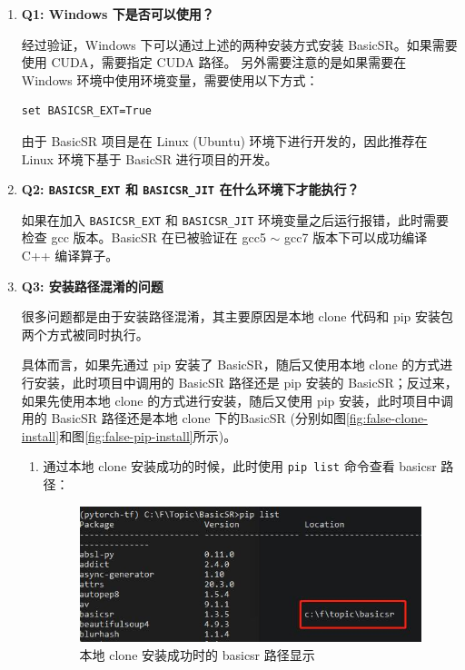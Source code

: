 \documentclass[../main.tex]{subfiles}
\begin{document}
\begin{enumerate}
    \item \textbf{Q1: Windows 下是否可以使用？}

          经过验证，Windows 下可以通过上述的两种安装方式安装 BasicSR。如果需要使用 CUDA，需要指定 CUDA 路径。	另外需要注意的是如果需要在 Windows 环境中使用环境变量，需要使用以下方式：
          \begin{verbatim}
set BASICSR_EXT=True
       \end{verbatim}

          由于 BasicSR 项目是在 Linux (Ubuntu) 环境下进行开发的，因此推荐在 Linux 环境下基于 BasicSR 进行项目的开发。

    \item \textbf{Q2: \texttt{BASICSR\_EXT} 和 \texttt{BASICSR\_JIT} 在什么环境下才能执行？}

          如果在加入 \texttt{BASICSR\_EXT} 和 \texttt{BASICSR\_JIT} 环境变量之后运行报错，此时需要检查 gcc 版本。BasicSR 在已被验证在 gcc5 $\sim$ gcc7 版本下可以成功编译 C++ 编译算子。

    \item \textbf{Q3: 安装路径混淆的问题}

          很多问题都是由于安装路径混淆，其主要原因是本地 clone 代码和 pip 安装包两个方式被同时执行。

          具体而言，如果先通过 pip 安装了 BasicSR，随后又使用本地 clone 的方式进行安装，此时项目中调用的 BasicSR 路径还是 pip 安装的 BasicSR；反过来，如果先使用本地 clone 的方式进行安装，随后又使用 pip 安装，此时项目中调用的 BasicSR 路径还是本地 clone 下的BasicSR (分别如图\ref{fig:false-clone-install}和图\ref{fig:false-pip-install}所示)。

          \begin{enumerate}
              \item 通过本地 clone 安装成功的时候，此时使用 \texttt{pip list} 命令查看 basicsr 路径：
                    \begin{figure}[H]
                        \begin{center}
                            \includegraphics[width=0.7\linewidth]{figures/installation_clone_install_location.jpg}
                            \caption{本地 clone 安装成功时的 basicsr 路径显示}
                            \label{fig:correct-clone-install}
                        \end{center}
                        \vspace{-0.5cm}
                    \end{figure}


\end{enumerate}
\end{enumerate}
\end{document}
